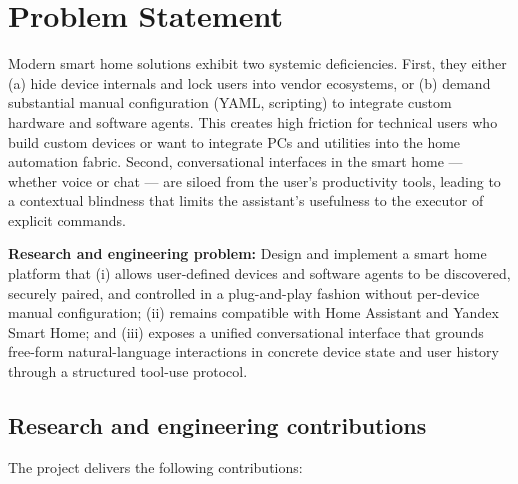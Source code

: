 \documentclass[a4paper,12pt]{article}
\begin{document}
\newpage

\section{Problem Statement}
\label{sec:problem}

Modern smart home solutions exhibit two systemic deficiencies. First, they either (a) hide device internals and lock users into vendor ecosystems, or (b) demand substantial manual configuration (YAML, scripting) to integrate custom hardware and software agents. This creates high friction for technical users who build custom devices or want to integrate PCs and utilities into the home automation fabric. Second, conversational interfaces in the smart home --- whether voice or chat --- are siloed from the user's productivity tools, leading to a contextual blindness that limits the assistant's usefulness to the executor of explicit commands.

\textbf{Research and engineering problem:} Design and implement a smart home platform that (i) allows user-defined devices and software agents to be discovered, securely paired, and controlled in a plug-and-play fashion without per-device manual configuration; (ii) remains compatible with Home Assistant and Yandex Smart Home; and (iii) exposes a unified conversational interface that grounds free-form natural-language interactions in concrete device state and user history through a structured tool-use protocol.

\subsection{Research and engineering contributions}

The project delivers the following contributions:
\end{document}
